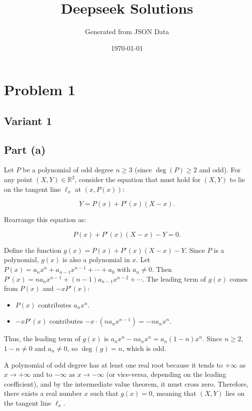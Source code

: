 \documentclass[12pt,a4paper]{article}
\title{Deepseek Solutions}
\author{Generated from JSON Data}
\date{\today}
\theoremstyle{definition}
\begin{document}
    \maketitle
    \tableofcontents
    \newpage
\section{Problem 1}

\subsection{Variant 1}

\subsection*{Part (a)}

Let $P$ be a polynomial of odd degree $n \geq 3$ (since $\deg(P) \geq 2$ and odd). For any point $(X, Y) \in \mathbb{R}^2$, consider the equation that must hold for $(X, Y)$ to lie on the tangent line $\ell_x$ at $(x, P(x))$:

\[
Y = P(x) + P'(x)(X - x).
\]

Rearrange this equation as:

\[
P(x) + P'(x)(X - x) - Y = 0.
\]

Define the function $g(x) = P(x) + P'(x)(X - x) - Y$. Since $P$ is a polynomial, $g(x)$ is also a polynomial in $x$. Let $P(x) = a_n x^n + a_{n-1} x^{n-1} + \cdots + a_0$ with $a_n \neq 0$. Then $P'(x) = n a_n x^{n-1} + (n-1) a_{n-1} x^{n-2} + \cdots$. The leading term of $g(x)$ comes from $P(x)$ and $-x P'(x)$:

\begin{itemize}
\item $P(x)$ contributes $a_n x^n$.
\item $-x P'(x)$ contributes $-x \cdot (n a_n x^{n-1}) = -n a_n x^n$.
\end{itemize}

Thus, the leading term of $g(x)$ is $a_n x^n - n a_n x^n = a_n (1 - n) x^n$. Since $n \geq 2$, $1 - n \neq 0$ and $a_n \neq 0$, so $\deg(g) = n$, which is odd.

A polynomial of odd degree has at least one real root because it tends to $+\infty$ as $x \to +\infty$ and to $-\infty$ as $x \to -\infty$ (or vice-versa, depending on the leading coefficient), and by the intermediate value theorem, it must cross zero. Therefore, there exists a real number $x$ such that $g(x) = 0$, meaning that $(X, Y)$ lies on the tangent line $\ell_x$.
\end{document}
